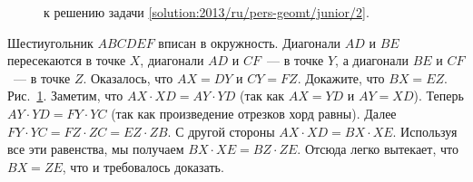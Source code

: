 \ifsolution
\begin{figure}\centering
    \caption{к решению задачи \ref{solution:2013/ru/pers-geomt/junior/2}.}
    \label{fig:solution:2013/ru/pers-geomt/junior/2}
\end{figure}
\fi %

\problem
Шестиугольник $ABCDEF$ вписан в окружность.
Диагонали $AD$ и $BE$ пересекаются в точке $X$, диагонали $AD$ и $CF$~--- в
точке $Y$, а диагонали $BE$ и $CF$~--- в точке $Z$.
Оказалось, что $AX = DY$ и $CY = FZ$.
Докажите, что $BX = EZ$.
\solution
\label{solution:2013/ru/pers-geomt/junior/2}
Рис.~\ref{fig:solution:2013/ru/pers-geomt/junior/2}.
Заметим, что $AX \cdot XD = AY \cdot YD$ (так как $AX=YD$ и $AY=XD$).
Теперь $AY \cdot YD = FY \cdot YC$ (так как произведение отрезков хорд равны).
Далее $FY \cdot YC = FZ \cdot ZC = EZ \cdot ZB$.
С другой стороны $AX \cdot XD = BX \cdot XE$.
Используя все эти равенства, мы получаем $BX \cdot XE = BZ \cdot ZE$.
Отсюда легко вытекает, что $BX = ZE$, что и требовалось доказать.
\endproblem

